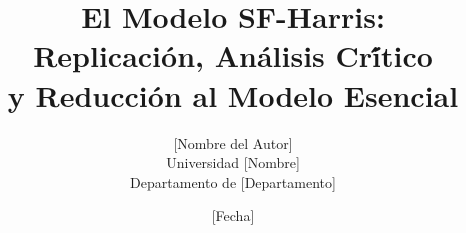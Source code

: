 
\usepackage[utf8]{inputenc}
\usepackage[T1]{fontenc}
\usepackage[spanish]{babel}
\usepackage{amsmath,amssymb,amsthm}
\usepackage{mathtools}
\usepackage{booktabs}
\usepackage{graphicx}
\usepackage{hyperref}
\usepackage{cleveref}
\usepackage{enumitem}
\usepackage{float}
\usepackage{subcaption}
\usepackage{geometry}
\usepackage{fancyhdr}
\usepackage{natbib}
\usepackage{xcolor}

\geometry{letterpaper, margin=1in, headheight=14.5pt}

\setcounter{tocdepth}{0}

\newtheorem{teorema}{Teorema}
\newtheorem{proposicion}[teorema]{Proposici\'{o}n}
\newtheorem{lema}[teorema]{Lema}
\newtheorem{corolario}[teorema]{Corolario}
\newtheorem{definicion}{Definici\'{o}n}
\newtheorem{observacion}{Observaci\'{o}n}

\newcommand{\E}{\mathbb{E}}
\newcommand{\Var}{\operatorname{Var}}
\newcommand{\Prob}{\mathbb{P}}
\newcommand{\R}{\mathbb{R}}
\newcommand{\N}{\mathcal{N}}
\newcommand{\iid}{\overset{\text{iid}}{\sim}}
\newcommand{\pstay}{p_{\text{stay}}}
\newcommand{\AAD}{\operatorname{AAD}}
\newcommand{\RV}{\operatorname{RV}}
\newcommand{\GIG}{\operatorname{GIG}}

\hypersetup{
    colorlinks=true,
    linkcolor=blue!70!black,
    citecolor=green!50!black,
    urlcolor=blue!70!black,
}

\title{
    \vspace{-2cm}
    \textbf{El Modelo SF-Harris: \\
    Replicaci\'{o}n, An\'{a}lisis Cr\'{\'i}tico \\
    y Reducci\'{o}n al Modelo Esencial}
}
\author{[Nombre del Autor] \\ \smallskip \small Universidad [Nombre] \\ Departamento de [Departamento]}
\date{[Fecha]}

\pagestyle{fancy}
\fancyhf{}
\fancyhead[L]{\leftmark}
\fancyhead[R]{\thepage}
\renewcommand{\headrulewidth}{0.4pt}